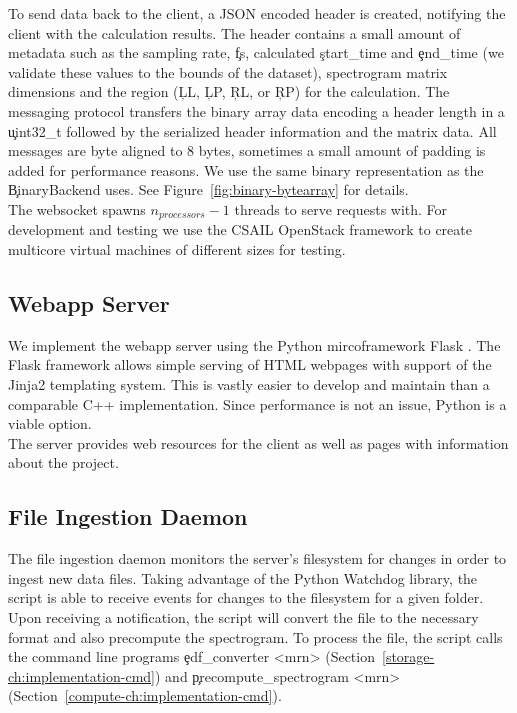 To send data back to the client, a JSON encoded header is created, notifying
the client with the calculation results. The header contains a small amount of
metadata such as the sampling rate, \c{fs}, calculated \c{start\_time} and
\c{end\_time} (we validate these values to the bounds of the dataset),
spectrogram matrix dimensions and the region (\c{LL}, \c{LP}, \c{RL}, or
\c{RP}) for the calculation.  The messaging protocol transfers the binary array
data encoding a header length in a \c{uint32\_t} followed by the serialized
header information and the matrix data. All messages are byte aligned to 8
bytes, sometimes a small amount of padding is added for performance reasons.
We use the same binary representation as the \c{BinaryBackend} uses. See
Figure~\ref{fig:binary-bytearray} for details.\\

The websocket spawns $n_{processors} - 1$ threads to serve requests with. For
development and testing we use the CSAIL OpenStack framework to create
multicore virtual machines of different sizes for testing.

\subsection{Webapp Server}\label{compute-ch:implementation-webapp}

We implement the webapp server using the Python mircoframework Flask
\cite{flask}. The Flask framework allows simple serving of HTML webpages with
support of the Jinja2 \cite{jinja2} templating system. This is vastly easier to
develop and maintain than a comparable C++ implementation. Since performance is
not an issue, Python is a viable option. \\

The server provides web resources for the client as well as pages with
information about the project.

\subsection{File Ingestion Daemon}

The file ingestion daemon monitors the server's filesystem for changes in order
to ingest new data files. Taking advantage of the Python Watchdog
\cite{watchdog} library, the script is able to receive events for changes to
the filesystem for a given folder. Upon receiving a notification, the script
will convert the file to the necessary format and also precompute the
spectrogram. To process the file, the script calls the command line programs
\c{edf\_converter <mrn>} (Section~\ref{storage-ch:implementation-cmd}) and
\c{precompute\_spectrogram <mrn>}
(Section~\ref{compute-ch:implementation-cmd}). \\


